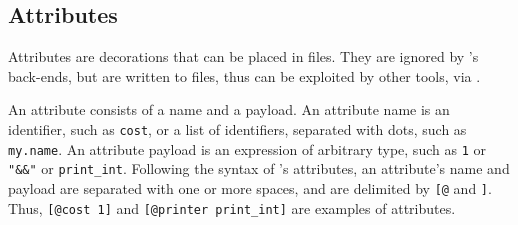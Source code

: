 \documentclass[onecolumn,11pt,nocopyrightspace,preprint]{sigplanconf}
\begin{document}

\subsection{Attributes}
\label{sec:attributes}

Attributes are decorations that can be placed in \mly files.
They are ignored by \menhir's back-ends,
but are written to \cmly files,
thus can be exploited by other tools, via \menhirsdk.

An attribute consists of a name and a payload. An attribute name is an \ocaml
identifier, such as \texttt{cost}, or a list of \ocaml identifiers, separated
with dots, such as \texttt{my.name}. An attribute payload is an \ocaml
expression of arbitrary type, such as \texttt{1} or \verb+"&&"+ or \verb+print_int+.
Following the syntax of \ocaml's attributes, an attribute's name and payload
are separated with one or more spaces, and are delimited by \verb+[@+ and
\verb+]+. Thus, \verb+[@cost 1]+ and \verb+[@printer print_int]+ are examples
of attributes.
\end{document}
